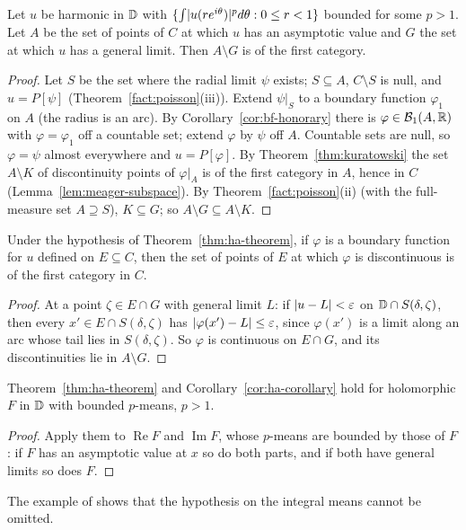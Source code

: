 \begin{theorem}\label{thm:ha-theorem}
Let $u$ be harmonic in $\mathbb{D}$ with $\{\int\lvert u(re^{i\theta})\rvert^pd\theta:0\le r<1\}$ bounded for some $p>1$. Let $A$ be the set of points of $C$
at which $u$ has an asymptotic value and $G$ the set at which $u$ has a general limit. Then $A\setminus G$ is of the first category.
\end{theorem}
\begin{proof}
Let $S$ be the set where the radial limit $\psi$ exists; $S\subseteq A$, $C\setminus S$ is null, and $u=P[\psi]$ (Theorem~\ref{fact:poisson}(iii)).
Extend $\psi|_S$ to a boundary function $\varphi_1$ on $A$ (the radius is an arc). By Corollary~\ref{cor:bf-honorary} there is
$\varphi\in\mathcal B_1(A,\mathbb{R})$ with $\varphi=\varphi_1$ off a countable set; extend $\varphi$ by $\psi$ off $A$. Countable sets are null, so
$\varphi=\psi$ almost everywhere and $u=P[\varphi]$. By Theorem~\ref{thm:kuratowski} the set $A\setminus K$ of discontinuity points of $\varphi|_A$
is of the first category in $A$, hence in $C$ (Lemma~\ref{lem:meager-subspace}). By Theorem~\ref{fact:poisson}(ii) (with the full-measure set
$A\supseteq S$), $K\subseteq G$; so $A\setminus G\subseteq A\setminus K$.
\end{proof}

\begin{corollary}\label{cor:ha-corollary}
Under the hypothesis of Theorem~\ref{thm:ha-theorem}, if $\varphi$ is a boundary function for $u$ defined on $E\subseteq C$, then the set of
points of $E$ at which $\varphi$ is discontinuous is of the first category in $C$.
\end{corollary}
\begin{proof}
At a point $\zeta\in E\cap G$ with general limit $L$: if $\lvert u-L\rvert<\varepsilon$ on $\mathbb{D}\cap S(\delta,\zeta)$, then every $x'\in E\cap S(\delta,\zeta)$ has
$\lvert \varphi(x')-L\rvert\le\varepsilon$, since $\varphi(x')$ is a limit along an arc whose tail lies in $S(\delta,\zeta)$. So $\varphi$ is continuous on $E\cap G$, and
its discontinuities lie in $A\setminus G$.
\end{proof}

\begin{corollary}\label{cor:ha-analytic}
Theorem~\ref{thm:ha-theorem} and Corollary~\ref{cor:ha-corollary} hold for holomorphic $F$ in $\mathbb{D}$ with bounded $p$-means, $p>1$.
\end{corollary}
\begin{proof}
Apply them to $\operatorname{Re}F$ and $\operatorname{Im}F$, whose $p$-means are bounded by those of $F$: if $F$ has an asymptotic value at $x$ so
do both parts, and if both have general limits so does $F$.
\end{proof}

\begin{remark}
The example of \cite[Theorem 6]{BP} shows that the hypothesis on the integral means cannot be omitted.
\end{remark}
